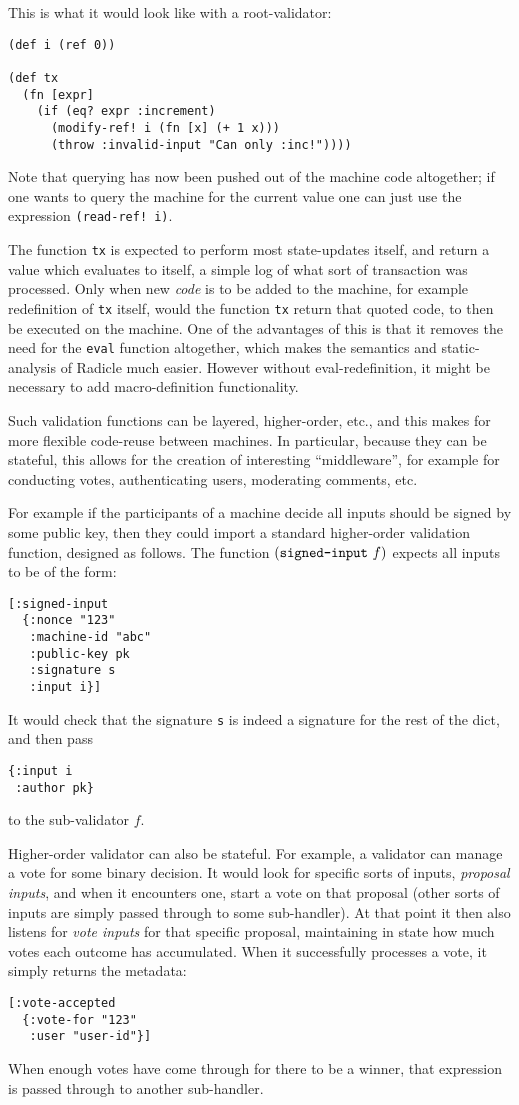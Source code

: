 \documentclass[a4paper, oneside, 10pt]{amsart}
\begin{document}
This is what it would look like with a root-validator:
\begin{lstlisting}
(def i (ref 0))

(def tx
  (fn [expr]
    (if (eq? expr :increment)
      (modify-ref! i (fn [x] (+ 1 x)))
      (throw :invalid-input "Can only :inc!"))))
\end{lstlisting}

Note that querying has now been pushed out of the machine code altogether; if
one wants to query the machine for the current value one can just use the
expression \texttt{(read-ref! i)}.

The function \texttt{tx} is expected to perform most state-updates itself, and
return a value which evaluates to itself, a simple log of what sort of
transaction was processed. Only when new \emph{code} is to be added to the
machine, for example redefinition of \texttt{tx} itself, would the function
\texttt{tx} return that quoted code, to then be executed on the machine. One of
the advantages of this is that it removes the need for the \texttt{eval}
function altogether, which makes the semantics and static-analysis of Radicle
much easier. However without eval-redefinition, it might be necessary to add
macro-definition functionality.

Such validation functions can be layered, higher-order, etc., and this makes for
more flexible code-reuse between machines. In particular, because they can be
stateful, this allows for the creation of interesting ``middleware'', for
example for conducting votes, authenticating users, moderating comments, etc.

For example if the participants of a machine decide all inputs should be signed
by some public key, then they could import a standard higher-order validation
function, designed as follows. The function $(\text{\texttt{signed-input}} \ f)$
expects all inputs to be of the form:
\begin{lstlisting}
[:signed-input
  {:nonce "123"
   :machine-id "abc"
   :public-key pk
   :signature s
   :input i}]
\end{lstlisting}
It would check that the signature \texttt{s} is indeed a signature for
the rest of the dict, and then pass
\begin{lstlisting}
{:input i
 :author pk}
\end{lstlisting}
to the sub-validator $f$.

Higher-order validator can also be stateful. For example, a validator can manage
a vote for some binary decision. It would look for specific sorts of inputs,
\emph{proposal inputs}, and when it encounters one, start a vote on that
proposal (other sorts of inputs are simply passed through to some
sub-handler). At that point it then also listens for \emph{vote inputs} for that
specific proposal, maintaining in state how much votes each outcome has
accumulated. When it successfully processes a vote, it simply returns the
metadata:
\begin{lstlisting}
[:vote-accepted
  {:vote-for "123"
   :user "user-id"}]
\end{lstlisting}
When enough votes have come through for there to be a winner, that expression is
passed through to another sub-handler.
\end{document}
